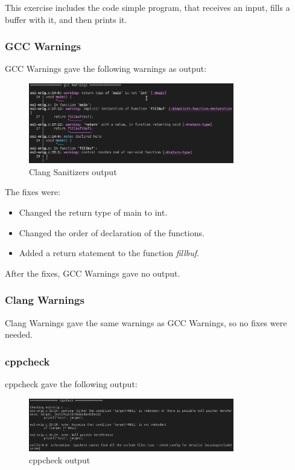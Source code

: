 \documentclass{article}
\begin{document}
This exercise includes the code simple program, that receives an input, fills a buffer with it, and then prints it.

\subsubsection{GCC Warnings}

GCC Warnings gave the following warnings as output:

\begin{figure}[ht!]
    \centering
    \includegraphics[width=0.8\textwidth]{images/ex2/gccWarnings.png}
    \caption{Clang Sanitizers output}\label{fig:ex2/gccWarnings}
\end{figure}

The fixes were:

\begin{itemize}
    \item Changed the return type of main to int.
    \item Changed the order of declaration of the functions.
    \item Added a return statement to the function \textit{fillbuf}.
\end{itemize}

After the fixes, GCC Warnings gave no output.

\subsubsection{Clang Warnings}

Clang Warnings gave the same warnings as GCC Warnings, so no fixes were needed.

\subsubsection{cppcheck}

cppcheck gave the following output:

\begin{figure}[ht!]
    \centering
    \includegraphics[width=0.8\textwidth]{images/ex2/cppcheck.png}
    \caption{cppcheck output}\label{fig:ex2/cppcheck}
\end{figure}
\end{document}
